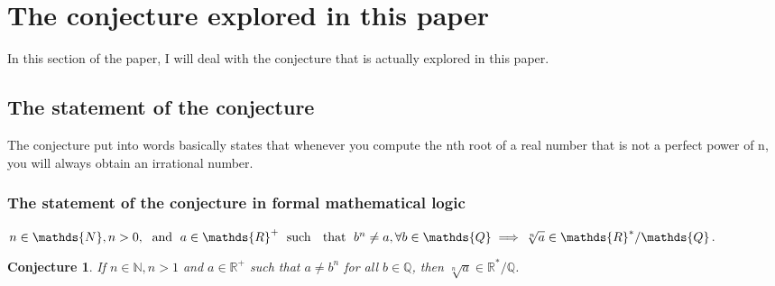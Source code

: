 \documentclass{turabian-researchpaper}
\newtheorem*{conjecture*}{Conjecture}
\begin{document}
\section{The conjecture explored in this paper} 
In this section of the paper, I will deal with the conjecture that is actually explored in this paper.  
\subsection{The statement of the conjecture}   
The conjecture put into words basically states that whenever you compute the nth root of a real number that is not a perfect power of n, you will always obtain an irrational number. 

\subsubsection{The statement of the conjecture in formal mathematical logic} 
\(n \in \mathds{N}, n > 0, \text{\hspace{0.1cm} and \hspace{0.1cm}} a \in \mathds{R}^{+} \text{\hspace{0.1cm} such \hspace{0.1cm} that \hspace{0.1cm}} b^{n} \neq a, \forall b \in \mathds{Q} \implies \sqrt[n]{a} \in \mathds{R}^{*}/\mathds{Q}\).  

\begin{conjecture*}
  If \(n \in \mathds{N}, n > 1\) and \(a \in \mathds{R}^{+}\) such that \(a \neq  b^n\) for all \(b \in \mathds{Q}\), then \(\sqrt[n]{a} \in \mathds{R}^{*}/\mathds{Q}\). 
\end{conjecture*} 
\end{document}
